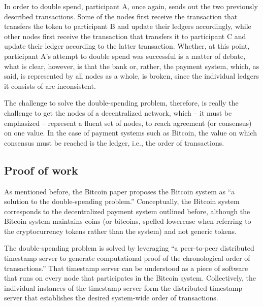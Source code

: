 In order to double spend, participant A, once again, sends out the two previously described transactions.
Some of the nodes first receive the transaction that transfers the token to participant B and update their ledgers accordingly, while other nodes first receive the transaction that transfers it to participant C and update their ledger according to the latter transaction.
Whether, at this point, participant A's attempt to double spend was successful is a matter of debate, what is clear, however, is that the bank or, rather, the payment system, which, as said, is represented by all nodes as a whole, is broken, since the individual ledgers it consists of are inconsistent.

The challenge to solve the double-spending problem, therefore, is really the challenge to get the nodes of a decentralized network, which -- it must be emphasized -- represent a fluent set of nodes, to reach agreement (or consensus) on one value.
In the case of payment systems such as Bitcoin, the value on which consensus must be reached is the ledger, i.e., the order of transactions.

\subsection{Proof of work}

As mentioned before, the Bitcoin paper proposes the Bitcoin system as ``a solution to the double-spending problem.'' \autocite[1]{bitcoin2008paper}
Conceptually, the Bitcoin system corresponds to the decentralized payment system outlined before, although the Bitcoin system maintains coins (or bitcoins, spelled lowercase when referring to the cryptocurrency tokens rather than the system) and not generic tokens.

The double-spending problem is solved by leveraging ``a peer-to-peer distributed timestamp server to generate computational proof of the chronological order of transactions.''
That timestamp server can be understood as a piece of software that runs on every node that participates in the Bitcoin system.
Collectively, the individual instances of the timestamp server form the distributed timestamp server that establishes the desired system-wide order of transactions.

